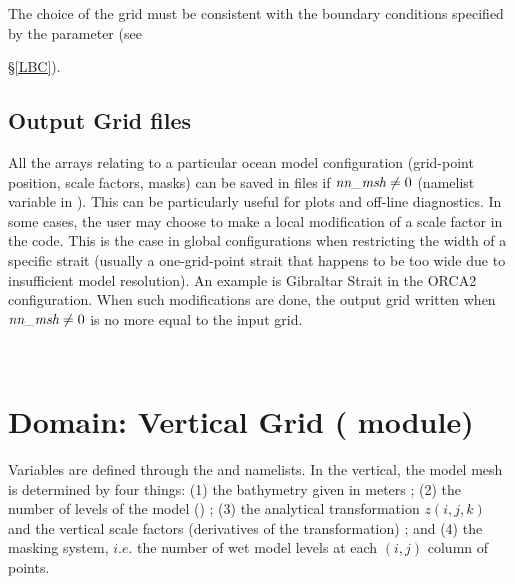 The choice of the grid must be consistent with the boundary conditions specified 
by the parameter  (see {\S\ref{LBC}).

\subsection{Output Grid files}
\label{DOM_hgr_files}

All the arrays relating to a particular ocean model configuration (grid-point 
position, scale factors, masks) can be saved in files if $\np{nn\_msh} \not= 0$ 
(namelist variable in ). This can be particularly useful for plots and off-line 
diagnostics. In some cases, the user may choose to make a local modification 
of a scale factor in the code. This is the case in global configurations when 
restricting the width of a specific strait (usually a one-grid-point strait that 
happens to be too wide due to insufficient model resolution). An example 
is Gibraltar Strait in the ORCA2 configuration. When such modifications are done, 
the output grid written when $\np{nn\_msh} \not=0$ is no more equal to the input grid.

$\ $\newline    %

\section  [Domain: Vertical Grid (\textit{domzgr})]
		{Domain: Vertical Grid \small{( module)} }
\label{DOM_zgr}

Variables are defined through the  and  namelists.
In the vertical, the model mesh is determined by four things: 
(1) the bathymetry given in meters ; 
(2) the number of levels of the model () ; 
(3) the analytical transformation $z(i,j,k)$ and the vertical scale factors 
(derivatives of the transformation) ; 
and (4) the masking system, $i.e.$ the number of wet model levels at each 
$(i,j)$ column of points.

}
